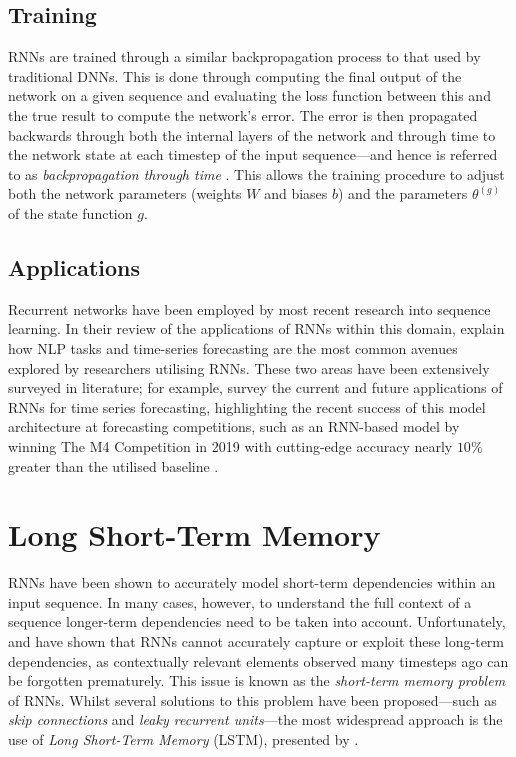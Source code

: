 \documentclass[a4paper, 11pt]{report}
\begin{document}
    \subsection{Training}

    RNNs are trained through a similar backpropagation process to that used by traditional DNNs. This is done through computing the final output of the network on a given sequence and evaluating the loss function between this and the true result to compute the network's error. The error is then propagated backwards through both the internal layers of the network and through time to the network state at each timestep of the input sequence---and hence is referred to as \emph{backpropagation through time} \citep{zhang-2021}. This allows the training procedure to adjust both the network parameters (weights $W$ and biases $b$) and the parameters $\theta^{(g)}$ of the state function $g$.


    \subsection{Applications}

    Recurrent networks have been employed by most recent research into sequence learning. In their review of the applications of RNNs within this domain, \citet{lipton-2015} explain how NLP tasks and time-series forecasting are the most common avenues explored by researchers utilising RNNs. These two areas have been extensively surveyed in literature; for example, \citet{hewamalage-2021} survey the current and future applications of RNNs for time series forecasting, highlighting the recent success of this model architecture at forecasting competitions, such as an RNN-based model by \citet{smyl-2020} winning The M4 Competition in 2019 with cutting-edge accuracy nearly $10\%$ greater than the utilised baseline \citep{makridakis-2020}.


    \section{Long Short-Term Memory}

    RNNs have been shown to accurately model short-term dependencies within an input sequence. In many cases, however, to understand the full context of a sequence longer-term dependencies need to be taken into account. Unfortunately, \citet{hochreiter-1991} and \citet{bengio-1994} have shown that RNNs cannot accurately capture or exploit these long-term dependencies, as contextually relevant elements observed many timesteps ago can be forgotten prematurely. This issue is known as the \emph{short-term memory problem} of RNNs. Whilst several solutions to this problem have been proposed---such as \emph{skip connections} and \emph{leaky recurrent units}---the most widespread approach is the use of \emph{Long Short-Term Memory} (LSTM), presented by \citet{hochreiter-1997}.
\end{document}
